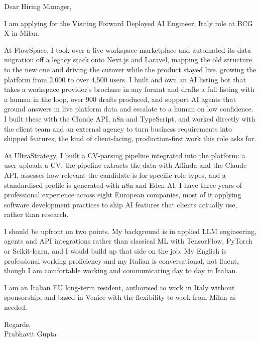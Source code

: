 \documentclass[a4paper,11pt]{article}
\begin{document}
Dear Hiring Manager,

I am applying for the Visiting Forward Deployed AI Engineer, Italy role at BCG X in Milan.

At FlowSpace, I took over a live workspace marketplace and automated its data migration off a legacy stack onto Next.js and Laravel, mapping the old structure to the new one and driving the cutover while the product stayed live, growing the platform from 2,000 to over 4,500 users. I built and own an AI listing bot that takes a workspace provider's brochure in any format and drafts a full listing with a human in the loop, over 900 drafts produced, and support AI agents that ground answers in live platform data and escalate to a human on low confidence. I built these with the Claude API, n8n and TypeScript, and worked directly with the client team and an external agency to turn business requirements into shipped features, the kind of client-facing, production-first work this role asks for.

At UltraStrategy, I built a CV-parsing pipeline integrated into the platform: a user uploads a CV, the pipeline extracts the data with Affinda and the Claude API, assesses how relevant the candidate is for specific role types, and a standardised profile is generated with n8n and Eden AI. I have three years of professional experience across eight European companies, most of it applying software development practices to ship AI features that clients actually use, rather than research.

I should be upfront on two points. My background is in applied LLM engineering, agents and API integrations rather than classical ML with TensorFlow, PyTorch or Scikit-learn, and I would build up that side on the job. My English is professional working proficiency and my Italian is conversational, not fluent, though I am comfortable working and communicating day to day in Italian.

I am an Italian EU long-term resident, authorised to work in Italy without sponsorship, and based in Venice with the flexibility to work from Milan as needed.

Regards,\\
Prabhavit Gupta
\end{document}
